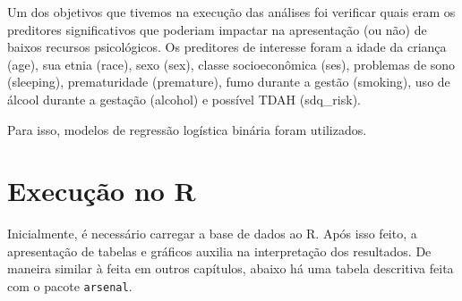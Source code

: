 \documentclass[
]{book}
\newenvironment{Shaded}{\begin{snugshade}}{\end{snugshade}}
\newcommand{\DataTypeTok}[1]{\textcolor[rgb]{0.13,0.29,0.53}{#1}}
\newcommand{\KeywordTok}[1]{\textcolor[rgb]{0.13,0.29,0.53}{\textbf{#1}}}
\newcommand{\NormalTok}[1]{#1}
\newcommand{\OperatorTok}[1]{\textcolor[rgb]{0.81,0.36,0.00}{\textbf{#1}}}
\newcommand{\OtherTok}[1]{\textcolor[rgb]{0.56,0.35,0.01}{#1}}
\newcommand{\StringTok}[1]{\textcolor[rgb]{0.31,0.60,0.02}{#1}}
\begin{document}
Um dos objetivos que tivemos na execução das análises foi verificar quais eram os preditores significativos que poderiam impactar na apresentação (ou não) de baixos recursos psicológicos. Os preditores de interesse foram a idade da criança (age), sua etnia (race), sexo (sex), classe socioeconômica (ses), problemas de sono (sleeping), prematuridade (premature), fumo durante a gestão (smoking), uso de álcool durante a gestação (alcohol) e possível TDAH (sdq\_risk).

Para isso, modelos de regressão logística binária foram utilizados.

\hypertarget{execuuxe7uxe3o-no-r-8}{%
\section{Execução no R}\label{execuuxe7uxe3o-no-r-8}}

Inicialmente, é necessário carregar a base de dados ao R. Após isso feito, a apresentação de tabelas e gráficos auxilia na interpretação dos resultados. De maneira similar à feita em outros capítulos, abaixo há uma tabela descritiva feita com o pacote \texttt{arsenal}.

\begin{Shaded}
\end{Shaded}
\end{document}
